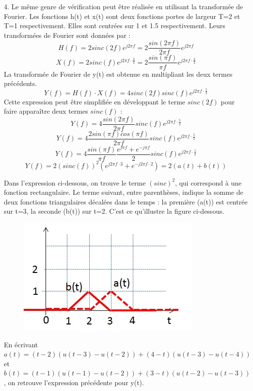 \documentclass[11pt]{report}
\begin{document}
	\vspace{0.5\baselineskip}
	
	4. Le même genre de vérification peut être réalisée en utilisant la transformée de Fourier. Les fonctions h(t) et x(t) sont deux fonctions portes de largeur T=2 et T=1 respectivement. Elles sont centrées sur 1 et 1.5 respectivement. Leurs transformées de Fourier sont données par :
	\begin{equation*}
	H(f)=2sinc(2f)e^{j2\pi f}=2\frac{sin(2\pi f)}{2\pi f}e^{j2\pi f}
	\end{equation*}
	\begin{equation*}
	X(f)=2sinc(f)e^{j2\pi f\cdot \frac{3}{2}}=2\frac{sin(\pi f)}{\pi f}e^{j2\pi f\cdot \frac{3}{2}}
	\end{equation*}
	La transformée de Fourier de y(t) est obtenue en multipliant les deux termes précédents.
	\begin{equation*}
	Y(f)=H(f) \cdot X(f) = 4sinc(2f)sinc(f)e^{j2\pi f\cdot \frac{5}{2}}
	\end{equation*}
	Cette expression peut être simplifiée en développant le terme $sinc(2f)$ pour faire apparaître deux termes $sinc(f)$ :
	\begin{equation*}
		Y(f)=4\frac{sin(2\pi f)}{2\pi f}sinc(f)e^{j2\pi f\cdot \frac{5}{2}}
	\end{equation*}
	\begin{equation*}
	Y(f)=4\frac{2sin(\pi f)cos(\pi f)}{2\pi f}sinc(f)e^{j2\pi f\cdot \frac{5}{2}}
	\end{equation*}
	\begin{equation*}
	Y(f)=4\frac{sin(\pi f)}{\pi f}\frac{e^{j\pi f}+e^{-j\pi f}}{2}sinc(f)e^{j2\pi f\cdot \frac{5}{2}}
	\end{equation*}
	\begin{equation*}
	Y(f)=2(sinc(f))^{2}(e^{j2\pi f\cdot 3}+e^{-j2\pi f\cdot 2})=2(a(t)+b(t))
	\end{equation*}
	
	Dans l'expression ci-dessous, on trouve le terme $(sinc)^{2}$, qui correspond à une fonction rectangulaire. Le terme suivant, entre parenthèses, indique la somme de deux fonctions triangulaires décalées dans le temps : la première (a(t)) est centrée sur t=3, la seconde (b(t)) sur t=2. C'est ce qu'illustre la figure ci-dessous.
	\begin{figure}[h!]
		\centering
		\includegraphics[scale=0.6]{images/Courbes_TD_Convolution_2_Solution_2.jpg} 
	\end{figure}
	En écrivant $a(t)=(t-2)(u(t-3)-u(t-2))+(4-t)(u(t-3)-u(t-4))$ et $b(t)=(t-1)(u(t-1)-u(t-2))+(3-t)(u(t-2)-u(t-3))$, on retrouve l'expression précédente pour y(t).
	
\end{document}
